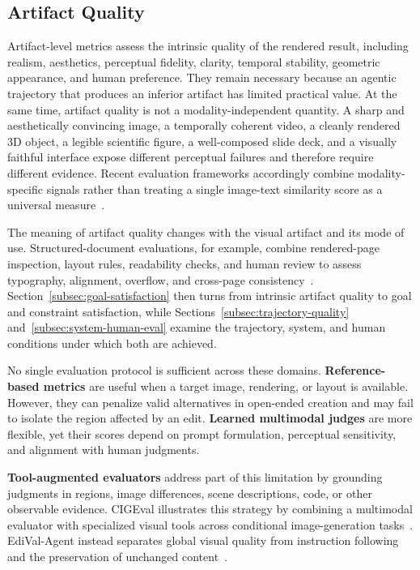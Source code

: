 \subsection{Artifact Quality}
\label{subsec:artifact-quality}

Artifact-level metrics assess the intrinsic quality of the rendered result, including realism, aesthetics, perceptual fidelity, clarity, temporal stability, geometric appearance, and human preference. They remain necessary because an agentic trajectory that produces an inferior artifact has limited practical value. At the same time, artifact quality is not a modality-independent quantity. A sharp and aesthetically convincing image, a temporally coherent video, a cleanly rendered 3D object, a legible scientific figure, a well-composed slide deck, and a visually faithful interface expose different perceptual failures and therefore require different evidence. Recent evaluation frameworks accordingly combine modality-specific signals rather than treating a single image-text similarity score as a universal measure~\cite{avg260329139,avg260530090,avg250913399,avg260601057,avg260526144,avg250407046}.

The meaning of artifact quality changes with the visual artifact and its mode of use. Structured-document evaluations, for example, combine rendered-page inspection, layout rules, readability checks, and human review to assess typography, alignment, overflow, and cross-page consistency~\cite{xu2025pregenie,zheng2026deeppresenter}. Section~\ref{subsec:goal-satisfaction} then turns from intrinsic artifact quality to goal and constraint satisfaction, while Sections~\ref{subsec:trajectory-quality} and~\ref{subsec:system-human-eval} examine the trajectory, system, and human conditions under which both are achieved.

No single evaluation protocol is sufficient across these domains. \textbf{Reference-based metrics} are useful when a target image, rendering, or layout is available. However, they can penalize valid alternatives in open-ended creation and may fail to isolate the region affected by an edit. \textbf{Learned multimodal judges} are more flexible, yet their scores depend on prompt formulation, perceptual sensitivity, and alignment with human judgments.

\textbf{Tool-augmented evaluators} address part of this limitation by grounding judgments in regions, image differences, scene descriptions, code, or other observable evidence. CIGEval illustrates this strategy by combining a multimodal evaluator with specialized visual tools across conditional image-generation tasks~\cite{avg250407046}. EdiVal-Agent instead separates global visual quality from instruction following and the preservation of unchanged content~\cite{avg250913399}.

